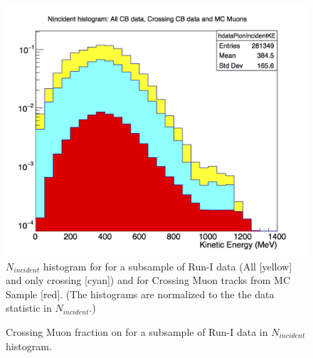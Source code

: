 \begin{figure}[h!]
\centering
\includegraphics[scale=0.5]{./images/CBAllandCross_CrossMuMC.png}
\caption{$N_{incident}$ histogram for for a subsample of Run-I data (All [yellow] and only crossing [cyan]) and for Crossing Muon tracks from MC Sample [red]. (The histograms are normalized to the the data statistic in $N_{incident}$.)}
\label{CrossingOBMuon}
\end{figure}

\begin{figure}[h!]
\centering
\caption{Crossing Muon fraction on for a subsample of Run-I data in $N_{incident}$ histogram. }
\label{CrossingFraction}
\end{figure}
